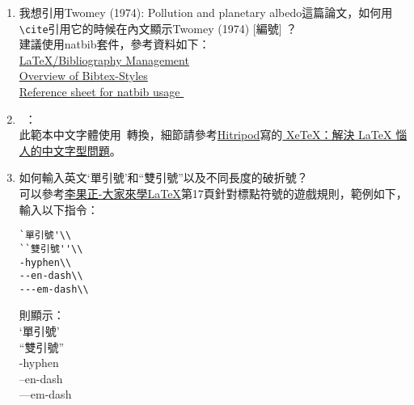 \begin{acknowledgementsCH}
\begin{enumerate}[leftmargin=0pt, topsep=0pt, itemsep=0pt, label=\Roman{*}.]
\begin{enumerate}[topsep=0pt, itemsep=0pt, label=$\bullet$]
    \begin{verbatim}
\RequirePackage[top=3cm,left=3cm,bottom=2cm,right=3cm]{geometry}
    \end{verbatim}
    \item 我想引用Twomey (1974): Pollution and planetary albedo這篇論文，如何用\texttt{\textbackslash cite}引用它的時候在內文顯示Twomey (1974) [編號] ？\\
    建議使用natbib套件，參考資料如下：\\
    \href{http://en.wikibooks.org/wiki/LaTeX/Bibliography_Management}{LaTeX/Bibliography Management}\\
    \href{http://nodonn.tipido.net/bibstyle.php}{Overview of Bibtex-Styles}\\
    \href{http://merkel.zoneo.net/Latex/natbib.php}{Reference sheet for natbib usage }\
 \item \XeTeX\ ：\\
    此範本中文字體使用\XeTeX\ 轉換，細節請參考\href{http://www.hitripod.com/blog/}{Hitripod}寫的\href{http://www.hitripod.com/blog/2011/04/xetex-chinese-font-cjk-latex/}{ 
XeTeX：解決 LaTeX 惱人的中文字型問題}。
 \item 如何輸入英文`單引號'和``雙引號''以及不同長度的破折號？\\
        可以參考\href{run:./latex123.pdf}{李果正-大家來學\LaTeX}第17頁針對標點符號的遊戲規則，範例如下，輸入以下指令：\\
        \begin{verbatim}
`單引號'\\
``雙引號''\\
-hyphen\\
--en-dash\\
---em-dash\\
        \end{verbatim} 
        則顯示：\\
       `單引號'\\
        ``雙引號''\\
        -hyphen\\
        --en-dash\\
        ---em-dash\\
    \end{enumerate} 
    \end{enumerate} 
               


 \end{acknowledgementsCH}